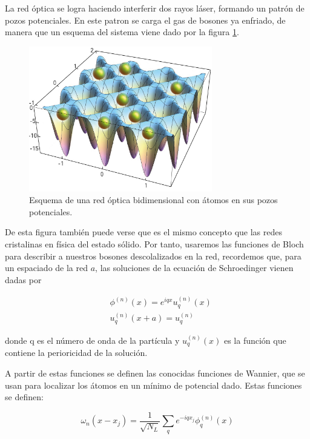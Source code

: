 \documentclass[11pt,a4paper]{article}
\begin{document}
La red óptica se logra haciendo interferir dos rayos láser, formando un patrón de pozos potenciales. En este patron se carga el gas de bosones ya enfriado, de manera que un esquema del sistema viene dado por la figura \ref{f:red}.

\begin{figure}[h]
  \centering
  \includegraphics[width=8cm]{hi_8148.jpg}
  \caption{Esquema de una red óptica bidimensional con átomos en sus pozos potenciales.}
  \label{f:red}
\end{figure}
\noindent

De esta figura también puede verse que es el mismo concepto que las redes cristalinas en física del estado sólido. Por tanto, usaremos las funciones de Bloch para describir a nuestros bosones descolalizados en la red, recordemos que, para un espaciado de la red $a$, las soluciones de la ecuación de Schroedinger vienen dadas por

\begin{equation}
  \begin{split}
    & \phi^{(n)}(x)=\textit{e}^{iqx}u_q^{(n)}(x) \\
    & u_q^{(n)}(x+a)=u_q^{(n)}
  \end{split}
\end{equation}

donde q es el número de onda de la partícula y $u_q^{(n)}(x)$ es la función que contiene la perioricidad de la solución.



A partir de estas funciones se definen las conocidas funciones de Wannier, que se usan para localizar los átomos en un mínimo de potencial dado. Estas funciones se definen:

\begin{equation}
  \omega_n(x-x_j)=\frac{1}{\sqrt{N_L}}\sum_q\textit{e}^{-iqx_j}\phi_q^{(n)}(x)
\end{equation}
\end{document}

